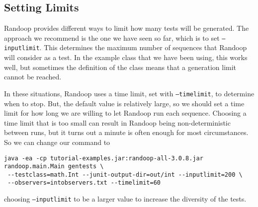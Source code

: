 \documentclass[11pt, oneside]{article} %
\newcommand{\cmd}[1]{{\texttt{#1}}}
\begin{document}
\subsection{Setting Limits}
Randoop provides different ways to limit how many tests will be generated.
The approach we recommend is the one we have seen so far, which is to set \cmd{--inputlimit}.
This determines the maximum number of sequences that Randoop will consider as a test.
In the example class that we have been using, this works well, but sometimes the definition of the class means that a generation limit cannot be reached.

In these situations, Randoop uses a time limit, set with \cmd{--timelimit}, to determine when to stop.
But, the default value is relatively large, so we should set a time limit for how long we are willing to let Randoop run each sequence. 
Choosing a time limit that is too small can result in Randoop being non-deterministic between runs, but it turns out a minute is often enough for most circumstances.
So we can change our command to 
\begin{verbatim}
java -ea -cp tutorial-examples.jar:randoop-all-3.0.8.jar randoop.main.Main gentests \
 --testclass=math.Int --junit-output-dir=out/int --inputlimit=200 \
 --observers=intobservers.txt --timelimit=60
\end{verbatim}
choosing \cmd{--inputlimit} to be a larger value to increase the diversity of the tests.
\end{document}
